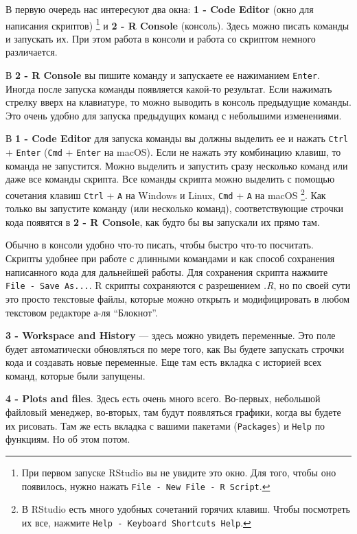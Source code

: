 \documentclass[]{book}
\begin{document}
В первую очередь нас интересуют два окна: \textbf{1 - Code Editor} (окно
для написания скриптов) \footnote{При первом запуске RStudio вы не
  увидите это окно. Для того, чтобы оно появилось, нужно нажать
  \texttt{File\ -\ New\ File\ -\ R\ Script}.} и \textbf{2 - R Console}
(консоль). Здесь можно писать команды и запускать их. При этом работа в
консоли и работа со скриптом немного различается.

В \textbf{2 - R Console} вы пишите команду и запускаете ее нажиманием
\texttt{Enter}. Иногда после запуска команды появляется какой-то
результат. Если нажимать стрелку вверх на клавиатуре, то можно выводить
в консоль предыдущие команды. Это очень удобно для запуска предыдущих
команд с небольшими изменениями.

В \textbf{1 - Code Editor} для запуска команды вы должны выделить ее и
нажать \texttt{Ctrl} + \texttt{Enter} (\texttt{Cmd} + \texttt{Enter} на
macOS). Если не нажать эту комбинацию клавиш, то команда не запустится.
Можно выделить и запустить сразу несколько команд или даже все команды
скрипта. Все команды скрипта можно выделить с помощью сочетания клавиш
\texttt{Ctrl} + \texttt{A} на Windows и Linux, \texttt{Cmd} + \texttt{A}
на macOS \footnote{В RStudio есть много удобных сочетаний горячих
  клавиш. Чтобы посмотреть их все, нажмите
  \texttt{Help\ -\ Keyboard\ Shortcuts\ Help}.}. Как только вы запустите
команду (или несколько команд), соответствующие строчки кода появятся в
\textbf{2 - R Console}, как будто бы вы запускали их прямо там.

Обычно в консоли удобно что-то писать, чтобы быстро что-то посчитать.
Скрипты удобнее при работе с длинными командами и как способ сохранения
написанного кода для дальнейшей работы. Для сохранения скрипта нажмите
\texttt{File\ -\ Save\ As...}. R скрипты сохраняются с разрешением
\emph{.R}, но по своей сути это просто текстовые файлы, которые можно
открыть и модифицировать в любом текстовом редакторе а-ля ``Блокнот''.

\textbf{3 - Workspace and History} --- здесь можно увидеть переменные.
Это поле будет автоматически обновляться по мере того, как Вы будете
запускать строчки кода и создавать новые переменные. Еще там есть
вкладка с историей всех команд, которые были запущены.

\textbf{4 - Plots and files}. Здесь есть очень много всего. Во-первых,
небольшой файловый менеджер, во-вторых, там будут появляться графики,
когда вы будете их рисовать. Там же есть вкладка с вашими пакетами
(\texttt{Packages}) и \texttt{Help} по функциям. Но об этом потом.
\end{document}
